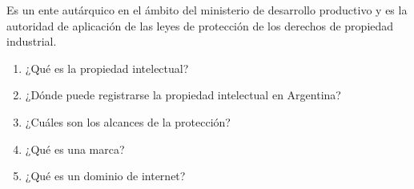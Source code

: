 \documentclass[../main]{subfiles}
\begin{document}
Es un ente autárquico en el ámbito del ministerio de desarrollo
productivo y es la autoridad de aplicación de las leyes de protección
de los derechos de propiedad industrial.

\begin{enumerate}
  \item ¿Qué es la propiedad intelectual?
  \item ¿Dónde puede registrarse la propiedad intelectual en Argentina?
  \item ¿Cuáles son los alcances de la protección?
  \item ¿Qué es una marca?
  \item ¿Qué es un dominio de internet?
\end{enumerate}
\end{document}
